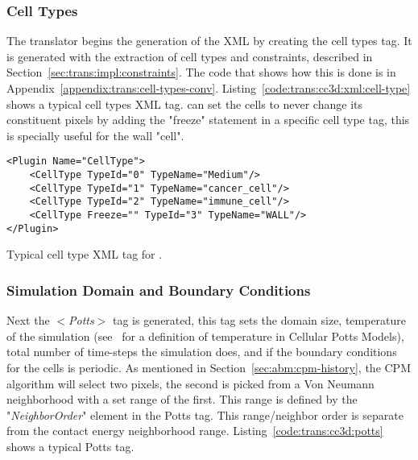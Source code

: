 \subsubsection{Cell Types}\label{sec:trans:gen:xml:cell-types}
The translator begins the generation of the XML by creating the cell types tag. It is generated with the extraction of cell types and constraints, described in Section~\ref{sec:trans:impl:constraints}. The code that shows how this is done is in Appendix~\ref{appendix:trans:cell-types-conv}. Listing~\ref{code:trans:cc3d:xml:cell-type} shows a typical cell types XML tag. \ccds can set the cells to never 
change its constituent pixels
by adding the "freeze" statement in a specific cell type tag, this is specially useful for the wall "cell".
\begin{listing}[H]%
\begin{verbatim}
<Plugin Name="CellType">
	<CellType TypeId="0" TypeName="Medium"/>
	<CellType TypeId="1" TypeName="cancer_cell"/>
	<CellType TypeId="2" TypeName="immune_cell"/>
	<CellType Freeze="" TypeId="3" TypeName="WALL"/>
</Plugin>
\end{verbatim}
\caption{Typical cell type XML tag for \ccd.}\label{code:trans:cc3d:xml:cell-type}
\end{listing}

\subsubsection{Simulation Domain and Boundary Conditions}\label{sec:trans:gen:xml:potts}
Next the \textit{$<$Potts$>$} tag is generated, this tag sets the domain size, temperature of the simulation (see~\cite{swat_multi-scale_2012} for a definition of temperature in Cellular Potts Models), total number of time-steps the simulation does, and if the boundary conditions for the cells is periodic. 
As mentioned in Section~\ref{sec:abm:cpm-history}, the CPM algorithm will select two pixels, the second is picked from a Von Neumann neighborhood with a set range of the first. This range is defined by the "\textit{NeighborOrder}" element in the Potts tag. This range/neighbor order is separate from the contact energy neighborhood range.
Listing~\ref{code:trans:cc3d:potts} shows a typical \ccds Potts tag.

